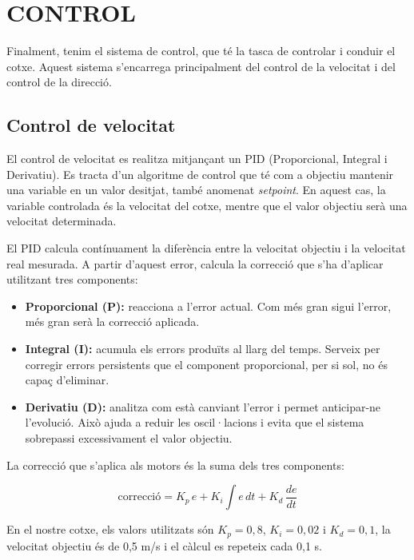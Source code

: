 \documentclass[11pt,a4paper]{article}
\let\origsection\section
\renewcommand{\section}{\clearpage\origsection}
\begin{document}
\section{CONTROL}

Finalment, tenim el sistema de control, que té la tasca de controlar i conduir el cotxe. Aquest sistema s'encarrega principalment del control de la velocitat i del control de la direcció.

\subsection{Control de velocitat}

El control de velocitat es realitza mitjançant un PID (Proporcional, Integral i Derivatiu). Es tracta d'un algoritme de control que té com a objectiu mantenir una variable en un valor desitjat, també anomenat \emph{setpoint}. En aquest cas, la variable controlada és la velocitat del cotxe, mentre que el valor objectiu serà una velocitat determinada.

El PID calcula contínuament la diferència entre la velocitat objectiu i la velocitat real mesurada. A partir d'aquest error, calcula la correcció que s'ha d'aplicar utilitzant tres components:
\nopagebreak

\begin{itemize}
  \item \textbf{Proporcional (P):} reacciona a l'error actual. Com més gran sigui l'error, més gran serà la correcció aplicada.
  \item \textbf{Integral (I):} acumula els errors produïts al llarg del temps. Serveix per corregir errors persistents que el component proporcional, per si sol, no és capaç d'eliminar.
  \item \textbf{Derivatiu (D):} analitza com està canviant l'error i permet anticipar-ne l'evolució. Això ajuda a reduir les oscil·lacions i evita que el sistema sobrepassi excessivament el valor objectiu.
\end{itemize}

La correcció que s’aplica als motors és la suma dels tres components:
\nopagebreak

\begin{equation*}
  \text{correcció} = K_p\,e + K_i\int e\,dt + K_d\,\frac{de}{dt}
\end{equation*}

En el nostre cotxe, els valors utilitzats són $K_p = 0{,}8$, $K_i = 0{,}02$ i $K_d = 0{,}1$, la velocitat objectiu és de 0,5 m/s i el càlcul es repeteix cada 0,1 s.
\end{document}

